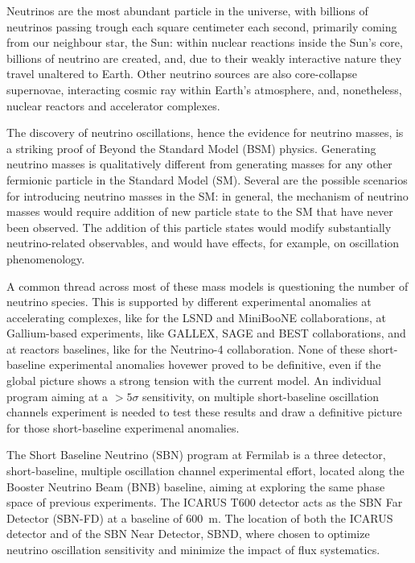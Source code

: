 

Neutrinos are the most abundant particle in the universe, with billions of neutrinos passing trough each square centimeter each second, primarily coming from our neighbour star, the Sun: within nuclear reactions inside the Sun's core, billions of neutrino are created, and, due to their weakly interactive nature they travel unaltered to Earth. Other neutrino sources are also core-collapse supernovae, interacting cosmic ray within Earth's atmosphere, and, nonetheless, nuclear reactors and accelerator complexes. 

The discovery of neutrino oscillations, hence the evidence for neutrino masses, is a striking proof of Beyond the Standard Model (BSM) physics. 
Generating neutrino masses is qualitatively different from generating masses for any other fermionic particle in the Standard Model (SM).  
Several are the possible scenarios for introducing neutrino masses in the SM: in general, the mechanism of neutrino masses would require addition of new particle state to the SM that have never been observed. The addition of this particle states would modify substantially neutrino-related observables, and would have effects, for example, on oscillation phenomenology. 



A common thread across most of these mass models is questioning the number of neutrino species. This is supported by different experimental anomalies at accelerating complexes, like for the LSND and MiniBooNE collaborations, at Gallium-based experiments, like GALLEX, SAGE and BEST collaborations, and at reactors baselines, like for the Neutrino-4 collaboration. None of these short-baseline experimental anomalies hovewer proved to be definitive, even if the global picture shows a strong tension with the current model. An individual program aiming at a $>5\sigma$ sensitivity, on multiple short-baseline oscillation channels experiment is needed to test these results and draw a definitive picture for those short-baseline experimenal anomalies. 

The Short Baseline Neutrino (SBN) program at Fermilab is a three detector, short-baseline, multiple oscillation channel experimental effort, located along the Booster Neutrino Beam (BNB) baseline, aiming at exploring the same phase space of previous experiments. 
The ICARUS T600 detector acts as the SBN Far Detector (SBN-FD) at a baseline of \SI{600}{\meter}.
The location of both the ICARUS detector and of the SBN Near Detector, SBND, where chosen to optimize neutrino oscillation sensitivity and minimize the impact of flux systematics. 

